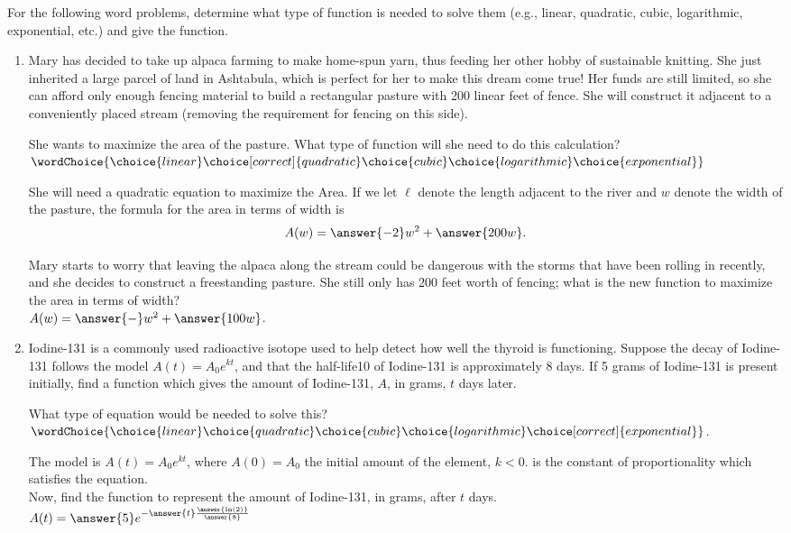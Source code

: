 \documentclass{ximera}
\author{Elizabeth Campolongo}
\begin{document}
\begin{exercise}
For the following word problems, determine what type of function is needed to solve them (e.g., linear, quadratic, cubic, logarithmic, exponential, etc.) and give the function. 
%
\begin{enumerate}
%
\item Mary has decided to take up alpaca farming to make home-spun yarn, thus feeding her other hobby of sustainable knitting. She just inherited a large parcel of land in Ashtabula, which is perfect for her to make this dream come true! Her funds are still limited, so she can afford only enough fencing material to build a rectangular pasture with 200 linear feet of fence. She will construct it adjacent to a conveniently placed stream (removing the requirement for fencing on this side). 

She wants to maximize the area of the pasture. What type of function will she need to do this calculation?\\
$\wordChoice{\choice{linear}\choice[correct]{quadratic}\choice{cubic}\choice{logarithmic}\choice{exponential}}$
\begin{exercise}
She will need a quadratic equation to maximize the Area. If we let $\ell$ denote the length adjacent to the river and $w$ denote the width of the pasture, the formula for the area in terms of width is
$$A(w) = \answer{-2}w^2 + \answer{200w}.$$

\begin{exercise} %
Mary starts to worry that leaving the alpaca along the stream could be dangerous with the storms that have been rolling in recently, and she decides to construct a freestanding pasture. She still only has 200 feet worth of fencing; what is the new function to maximize the area in terms of width?\\
$A(w) = \answer{-}w^2 + \answer{100w}$.
\end{exercise}
\end{exercise}

\item  Iodine-131 is a commonly used radioactive isotope used to help detect how well
the thyroid is functioning. Suppose the decay of Iodine-131 follows the model $A(t) = A_0e^{kt}$,
and that the half-life10 of Iodine-131 is approximately 8 days. 
If 5 grams of Iodine-131 is present
initially, find a function which gives the amount of Iodine-131, $A$, in grams, $t$ days later.

What type of equation would be needed to solve this?\\
$\wordChoice{\choice{linear}\choice{quadratic}\choice{cubic}\choice{logarithmic}\choice[correct]{exponential}}$.
\begin{exercise}
The model is $A(t) = A_0e^{kt}$, where $A(0)=A_0$ the initial amount of the element, $k<0$. is the constant of proportionality which satisfies the equation. \\
Now, find the function to represent the amount of Iodine-131, in grams, after $t$ days. \\
$A(t) = \answer{5}e^{-\answer{t} \frac{\answer{\ln(2)}}{\answer{8}}}$
\end{exercise}



\end{enumerate}
\end{exercise}
\end{document}
